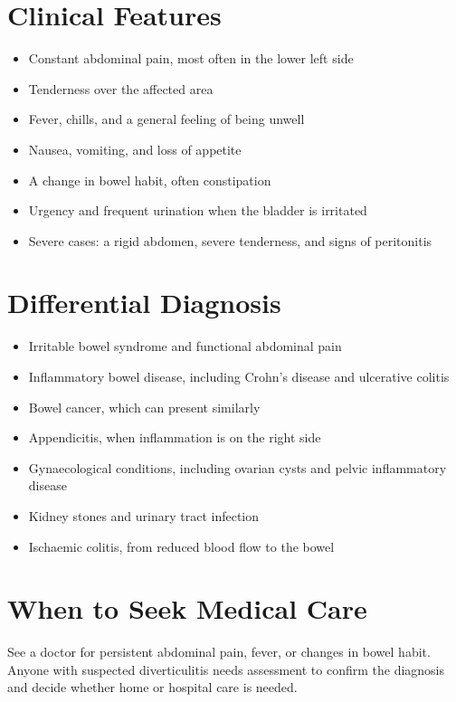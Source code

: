 \section*{Clinical Features}
\begin{itemize}
    \item Constant abdominal pain, most often in the lower left side
    \item Tenderness over the affected area
    \item Fever, chills, and a general feeling of being unwell
    \item Nausea, vomiting, and loss of appetite
    \item A change in bowel habit, often constipation
    \item Urgency and frequent urination when the bladder is irritated
    \item Severe cases: a rigid abdomen, severe tenderness, and signs of peritonitis
\end{itemize}

\section*{Differential Diagnosis}
\begin{itemize}
    \item Irritable bowel syndrome and functional abdominal pain
    \item Inflammatory bowel disease, including Crohn's disease and ulcerative colitis
    \item Bowel cancer, which can present similarly
    \item Appendicitis, when inflammation is on the right side
    \item Gynaecological conditions, including ovarian cysts and pelvic inflammatory disease
    \item Kidney stones and urinary tract infection
    \item Ischaemic colitis, from reduced blood flow to the bowel
\end{itemize}

\section*{When to Seek Medical Care}
See a doctor for persistent abdominal pain, fever, or changes in bowel habit. Anyone with suspected diverticulitis needs assessment to confirm the diagnosis and decide whether home or hospital care is needed.

